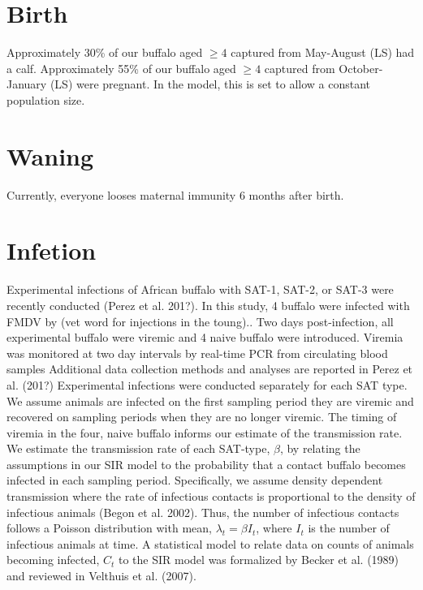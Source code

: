 \documentclass[letterpaper,12pt]{article}
\begin{document}
\section{Birth} 
Approximately 30\% of our buffalo aged $\geq 4$ captured from May-August (LS) had a calf. 
Approximately 55\% of our buffalo aged $\geq 4$ captured from October-January (LS) were pregnant.  
In the model, this is set to allow a constant population size. 
\pagebreak

\section{Waning} 
Currently, everyone looses maternal immunity 6 months after birth.  \\

\section{Infetion} 

Experimental infections of African buffalo with SAT-1, SAT-2, or SAT-3 were recently conducted (Perez et al. 201?).
In this study, 4 buffalo were infected with FMDV by (vet word for injections in the toung)..  
Two days post-infection, all experimental buffalo were viremic and 4 naive buffalo were introduced.
Viremia was monitored at two day intervals by real-time PCR from circulating blood samples
Additional data collection methods and analyses are reported in Perez et al. (201?)
Experimental infections were conducted separately for each SAT type. 
We assume animals are infected on the first sampling period they are viremic and recovered on sampling periods when they are no longer viremic.
The timing of viremia in the four, naive buffalo informs our estimate of the transmission rate. \\

We estimate the transmission rate of each SAT-type, $\beta$, by relating the assumptions in our SIR model to the probability that a contact buffalo becomes infected in each sampling period.
Specifically, we assume density dependent transmission where the rate of infectious contacts is proportional to the density of infectious animals (Begon et al. 2002).
Thus, the number of infectious contacts follows a Poisson distribution with mean, $\lambda_t = \beta  I_t$, where $I_t$ is the number of infectious animals at time. 
A statistical model to relate data on counts of animals becoming infected, $C_t$ to the SIR model was formalized by Becker et al. (1989) and reviewed in Velthuis et al. (2007). \\
\end{document}
